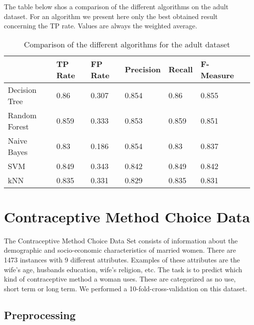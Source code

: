 \documentclass[paper=a4, fontsize=11pt]{scrartcl} %
\numberwithin{equation}{section} %
\numberwithin{figure}{section} %
\numberwithin{table}{section} %
\begin{document}
The table below shos a comparison of the different algorithms on the adult dataset. For an algorithm we present here only the best obtained result concerning the TP rate. Values are always the weighted average.

\begin{table}[h]
\centering
\begin{tabular}{lllllll}
	\toprule
									&TP Rate   	&FP Rate   &Precision &Recall  &F-Measure  \\
	\midrule
	Decision Tree		& 0.86    	& 0.307   	& 0.854   & 0.86   & 0.855     \\
  Random Forest		& 0.859   	& 0.333   	& 0.853   & 0.859  & 0.851    \\
  Naive Bayes		 	&  0.83    & 0.186   & 0.854     & 0.83   & 0.837     \\
  SVM							& 0.849    	& 0.343     &0.842   	&0.849   &0.842     \\
  kNN							&0.835     	&0.331      &0.829    &0.835   &0.831			\\
	\bottomrule
\end{tabular}
\caption{Comparison of the different algorithms for the adult dataset}
\end{table}





\section{Contraceptive Method Choice Data}

\paragraph{}The Contraceptive Method Choice Data Set consists of information about the demographic and socio-economic characteristics of married women. There are 1473 instances with 9 different attributes. Examples of these attributes are the wife's age, husbands education, wife's religion, etc. The task is to predict which kind of contraceptive method a woman uses. These are categorized as no use, short term or long term. We performed a 10-fold-cross-validation on this dataset.

\subsection{Preprocessing}
\end{document}
